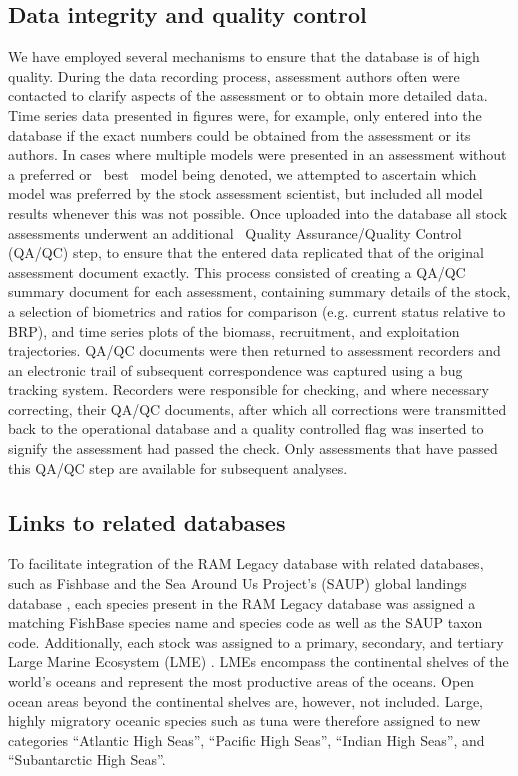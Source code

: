 \documentclass[letterpaper,12pt]{article}
\begin{document}
\subsection*{Data integrity and quality control}
We have employed several mechanisms to ensure that the database is of
high quality. During the data recording process, assessment authors
often were contacted to clarify aspects of the assessment or to obtain
more detailed data. Time series data presented in figures were, for
example, only entered into the database if the exact numbers could be
obtained from the assessment or its authors. In cases where multiple
models were presented in an assessment without a preferred or ~best~
model being denoted, we attempted to ascertain which model was
preferred by the stock assessment scientist, but included all model
results whenever this was not possible.  Once uploaded into the
database all stock assessments underwent an additional ~Quality
Assurance/Quality Control~ (QA/QC) step, to ensure that the entered
data replicated that of the original assessment document exactly. This
process consisted of creating a QA/QC summary document for each
assessment, containing summary details of the stock, a selection of
biometrics and ratios for comparison (e.g. current status relative to
BRP), and time series plots of the biomass, recruitment, and
exploitation trajectories. QA/QC documents were then returned to
assessment recorders and an electronic trail of subsequent
correspondence was captured using a bug tracking system. Recorders
were responsible for checking, and where necessary correcting, their
QA/QC documents, after which all corrections were transmitted back to
the operational database and a quality controlled flag was inserted to
signify the assessment had passed the check. Only assessments that
have passed this QA/QC step are available for subsequent analyses.

\subsection*{Links to related databases}
To facilitate integration of the RAM Legacy database with related
databases, such as Fishbase \citep{Froese:Pauly:2009:fishbase} and the
Sea Around Us Project's (SAUP) global landings database
\citep{Watson:etal:2004:fandf}, each species present in the RAM Legacy
database was assigned a matching FishBase species name and species
code as well as the SAUP taxon code. Additionally, each stock was
assigned to a primary, secondary, and tertiary Large Marine Ecosystem
(LME) \citep{NOAA:LME64:1998}.  LMEs encompass the continental shelves
of the world's oceans and represent the most productive areas of the
oceans.  Open ocean areas beyond the continental shelves are, however,
not included. Large, highly migratory oceanic species such as tuna
were therefore assigned to new categories ``Atlantic High Seas'',
``Pacific High Seas'', ``Indian High Seas'', and ``Subantarctic High
Seas''.
\end{document}
